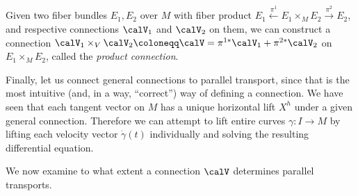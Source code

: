 \begin{rem}
    Given two fiber bundles $E_1,E_2$ over $M$ with fiber product $E_1\overset{\pi^1}{\leftarrow}E_1\times_M E_2\overset{\pi^2}{\to}E_2$, and respective connections $\calV_1$ and $\calV_2$ on them, we can construct a connection $\calV_1\times_V\calV_2\coloneqq \calV=\pi^{1\ast}\calV_1+\pi^{2\ast}\calV_2$ on $E_1\times_M E_2$, called the \emph{product connection}.
\end{rem}


Finally, let us connect general connections to parallel transport, since that is the most intuitive (and, in a way, ``correct'') way of defining a connection. We have seen that each tangent vector on $M$ has a unique horizontal lift $X^h$ under a given general connection. Therefore we can attempt to lift entire curves $\gamma:I\to M$ by lifting each velocity vector $\dot\gamma(t)$ individually and solving the resulting differential equation.


We now examine to what extent a connection $\calV$ determines parallel transports.

